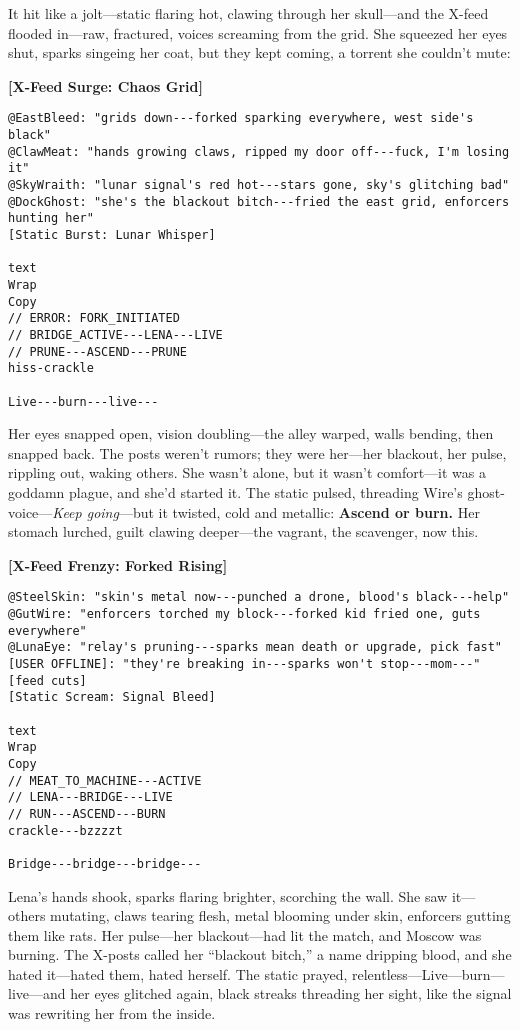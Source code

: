 \documentclass[12pt]{book}
\begin{document}
It hit like a jolt---static flaring hot, clawing through her skull---and the X-feed flooded in---raw, fractured, voices screaming from the grid. She squeezed her eyes shut, sparks singeing her coat, but they kept coming, a torrent she couldn’t mute:

\bigskip
\noindent\textbf{[X-Feed Surge: Chaos Grid]}

\begin{verbatim}
@EastBleed: "grids down---forked sparking everywhere, west side's black"
@ClawMeat: "hands growing claws, ripped my door off---fuck, I'm losing it"
@SkyWraith: "lunar signal's red hot---stars gone, sky's glitching bad"
@DockGhost: "she's the blackout bitch---fried the east grid, enforcers hunting her"
[Static Burst: Lunar Whisper]

text
Wrap
Copy
// ERROR: FORK_INITIATED  
// BRIDGE_ACTIVE---LENA---LIVE  
// PRUNE---ASCEND---PRUNE  
hiss-crackle

Live---burn---live---
\end{verbatim}
\bigskip

Her eyes snapped open, vision doubling---the alley warped, walls bending, then snapped back. The posts weren’t rumors; they were her---her blackout, her pulse, rippling out, waking others. She wasn’t alone, but it wasn’t comfort---it was a goddamn plague, and she’d started it. The static pulsed, threading Wire’s ghost-voice---\textit{Keep going}---but it twisted, cold and metallic: \textbf{Ascend or burn.} Her stomach lurched, guilt clawing deeper---the vagrant, the scavenger, now this.

\bigskip
\noindent\textbf{[X-Feed Frenzy: Forked Rising]}

\begin{verbatim}
@SteelSkin: "skin's metal now---punched a drone, blood's black---help"
@GutWire: "enforcers torched my block---forked kid fried one, guts everywhere"
@LunaEye: "relay's pruning---sparks mean death or upgrade, pick fast"
[USER OFFLINE]: "they're breaking in---sparks won't stop---mom---" [feed cuts]
[Static Scream: Signal Bleed]

text
Wrap
Copy
// MEAT_TO_MACHINE---ACTIVE  
// LENA---BRIDGE---LIVE  
// RUN---ASCEND---BURN  
crackle---bzzzzt

Bridge---bridge---bridge---
\end{verbatim}
\bigskip

Lena’s hands shook, sparks flaring brighter, scorching the wall. She saw it---others mutating, claws tearing flesh, metal blooming under skin, enforcers gutting them like rats. Her pulse---her blackout---had lit the match, and Moscow was burning. The X-posts called her “blackout bitch,” a name dripping blood, and she hated it---hated them, hated herself. The static prayed, relentless---Live---burn---live---and her eyes glitched again, black streaks threading her sight, like the signal was rewriting her from the inside.
\end{document}
